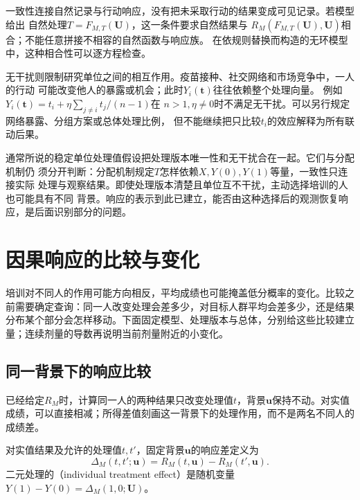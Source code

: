一致性连接自然记录与行动响应，没有把未采取行动的结果变成可见记录。若模型给出
自然处理\(T=F_{M,T}(\bm U)\)，这一条件要求自然结果与
\(R_M(F_{M,T}(\bm U),\bm U)\)相合；不能任意拼接不相容的自然函数与响应族。
在依规则替换而构造的无环模型中，这种相合性可以逐方程检查。

无干扰则限制研究单位之间的相互作用。疫苗接种、社交网络和市场竞争中，一人的行动
可能改变他人的暴露或机会；此时\(Y_i(\bm t)\)往往依赖整个处理向量。
例如\(Y_i(\bm t)=t_i+\eta\sum_{j\ne i}t_j/(n-1)\)在
\(n>1,\eta\ne0\)时不满足无干扰。可以另行规定网络暴露、分组方案或总体处理比例，
但不能继续把只比较\(t_i\)的效应解释为所有联动后果。

通常所说的稳定单位处理值假设把处理版本唯一性和无干扰合在一起。它们与分配机制仍
须分开判断：分配机制规定\(T\)怎样依赖\(X,Y(0),Y(1)\)等量，一致性只连接实际
处理与观察结果。即使处理版本清楚且单位互不干扰，主动选择培训的人也可能具有不同
背景。响应的表示到此已建立，能否由这种选择后的观测恢复响应，是后面识别部分的问题。

\section{因果响应的比较与变化}
\label{sec:causal-response-comparison}

培训对不同人的作用可能方向相反，平均成绩也可能掩盖低分概率的变化。比较之前需要确定查询：同一人改变处理会差多少，对目标人群平均会差多少，还是结果分布某个部分会怎样移动。下面固定模型、处理版本与总体，分别给这些比较建立量；连续剂量的导数再说明当前剂量附近的小变化。

\subsection{同一背景下的响应比较}
\label{sec:causal-individual-response}

已经给定\(R_M\)时，计算同一人的两种结果只改变处理值\(t\)，背景\(\bm u\)保持不动。对实值成绩，可以直接相减；所得差值刻画这一背景下的处理作用，而不是两名不同人的成绩差。

\begin{definition}[同一背景下的响应差]
  \label{def:causal-individual-effect}
  对实值结果及允许的处理值\(t,t'\)，固定背景\(\bm u\)的响应差定义为
  \begin{equation}
    \Delta_M(t,t';\bm u)=R_M(t,\bm u)-R_M(t',\bm u).
    \label{eq:causal-individual-response-difference}
  \end{equation}
  二元处理的（individual treatment effect）是随机变量
  \(Y(1)-Y(0)=\Delta_M(1,0;\bm U)\)。
\end{definition}

